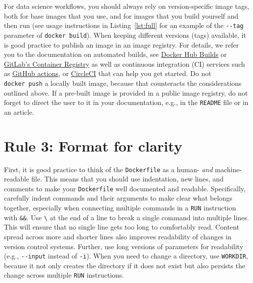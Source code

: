 \documentclass[10pt,letterpaper]{article}
\begin{document}
For data science workflows, you should always rely on version-specific
image tags, both for base images that you use, and for images that you
build yourself and then run (see usage instructions in
Listing~\ref{lst:full} for an example of the \texttt{-\/-tag} parameter
of \texttt{docker\ build}). When keeping different versions (tags)
available, it is good practice to publish an image in an image registry.
For details, we refer you to the documentation on automated builds, see
\href{https://docs.docker.com/docker-hub/builds/}{Docker Hub Builds} or
\href{https://docs.gitlab.com/ee/user/packages/container_registry/index.html\#build-and-push-images}{GitLab's
Container Registry} as well as continuous integration (CI) services such
as
\href{https://github.com/actions/starter-workflows/tree/master/ci}{GitHub
actions}, or
\href{https://circleci.com/orbs/registry/orb/circleci/docker\#commands-build}{CircleCI}
that can help you get started. Do not \texttt{docker\ push} a locally
built image, because that counteracts the considerations outlined above.
If a pre-built image is provided in a public image registry, do not
forget to direct the user to it in your documentation, e.g., in the
\texttt{README} file or in an article.

\hypertarget{rule-3-format-for-clarity}{%
\section{Rule 3: Format for clarity}\label{rule-3-format-for-clarity}}

  \label{rule:formatting} 
  \label{rule:clarity} 

First, it is good practice to think of the \texttt{Dockerfile} as a
human- \emph{and} machine-readable file. This means that you should use
indentation, new lines, and comments to make your \texttt{Dockerfile}
well documented and readable. Specifically, carefully indent commands
and their arguments to make clear what belongs together, especially when
connecting multiple commands in a \texttt{RUN} instruction with
\texttt{\&\&}. Use \texttt{\textbackslash{}} at the end of a line to
break a single command into multiple lines. This will ensure that no
single line gets too long to comfortably read. Content spread across
more and shorter lines also improves readability of changes in version
control systems. Further, use long versions of parameters for
readability (e.g., \texttt{-\/-input} instead of \texttt{-i}). When you
need to change a directory, use \texttt{WORKDIR}, because it not only
creates the directory if it does not exist but also persists the change
across multiple \texttt{RUN} instructions.
\end{document}

